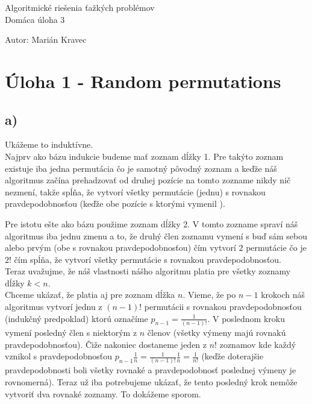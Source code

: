 \documentclass[a4paper]{article}
\begin{document}
 
	
\pagestyle{plain}

\begin{center}
	\sc\large
	Algoritmické riešenia ťažkých problémov\\
	Domáca úloha 3
\end{center}

Autor: Marián Kravec

\section{Úloha 1 -  Random permutations}

\subsection*{a)}

Ukážeme to induktívne.
\\

Najprv ako bázu indukcie budeme mať zoznam dĺžky 1. Pre takýto zoznam existuje iba jedna permutácia čo je samotný pôvodný zoznam a keďže náš algoritmus začína prehadzovať od druhej pozície na tomto zozname nikdy nič nezmení, takže spĺňa, že vytvorí všetky permutácie (jednu) s rovnakou pravdepodobnosťou (keďže obe pozície s ktorými vymenil ).

Pre istotu ešte ako bázu použime zoznam dĺžky 2. V tomto zozname spraví náš algoritmus iba jednu zmenu a to, že druhý člen zoznamu vymení s buď sám sebou alebo prvým (obe s rovnakou pravdepodobnosťou) čím vytvorí $2$ permutácie čo je $2!$ čím spĺňa, že vytvorí všetky permutácie s rovnakou pravdepodobnosťou.
\\

Teraz uvažujme, že náš vlastnosti nášho algoritmu platia pre všetky zoznamy dĺžky $k<n$.
\\

Chceme ukázať, že platia aj pre zoznam dĺžka $n$. Vieme, že po $n-1$ krokoch náš algoritmus vytvorí jednu z $(n-1)!$ permutácii s rovnakou pravdepodobnosťou (indukčný predpoklad) ktorú označíme $p_{n-1}=\frac{1}{(n-1)!}$. V poslednom kroku vymení posledný člen s niektorým z $n$ členov (všetky výmeny majú rovnakú pravdepodobnosťou). Čiže nakoniec dostaneme jeden z $n!$ zoznamov kde každý vznikol s pravdepodobnosťou  $p_{n-1}\frac{1}{n}=\frac{1}{(n-1)!}\frac{1}{n}=\frac{1}{n!}$ (keďže doterajšie pravdepodobnosti boli všetky rovnaké a pravdepodobnosť poslednej výmeny je rovnomerná). Teraz už iba potrebujeme ukázať, že tento posledný krok nemôže vytvoriť dva rovnaké zoznamy. To dokážeme sporom.
\\
\end{document}
